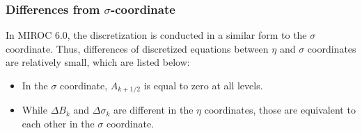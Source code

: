 \hypertarget{differences-from-sigma-coordinate}{%
\subsubsection{\texorpdfstring{Differences from
\(\sigma\)-coordinate}{Differences from \textbackslash{}sigma-coordinate}}\label{differences-from-sigma-coordinate}}

In MIROC 6.0, the discretization is conducted in a similar form to the \(\sigma\) coordinate.
Thus, differences of discretized equations between $\eta$ and $\sigma$ coordinates are relatively small, which are listed below:

\begin{itemize}
\tightlist
\item
  In the $\sigma$ coordinate, \(A_{k+1/2}\) is equal to zero at all levels.
\item
  While \(\Delta B_k\) and \(\Delta \sigma_k\) are different in the $\eta$ coordinates, those are equivalent to each other in the \(\sigma\) coordinate.
\end{itemize}
